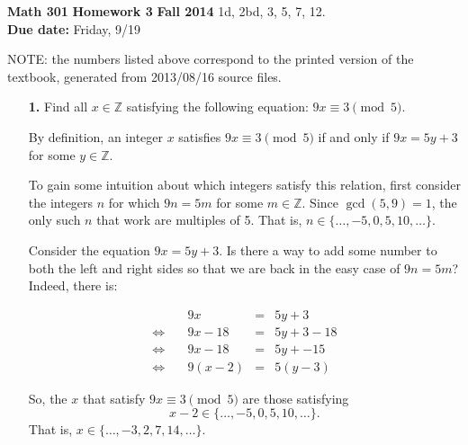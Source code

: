\documentclass[12pt,reqno]{amsart}
\newcommand{\Z}{\ensuremath{\mathbb{Z}}}
\newcommand{\<}{\ensuremath{\langle}}
\renewcommand{\>}{\ensuremath{\rangle}}
\begin{document}
\thispagestyle{empty}

\noindent \textbf{Math 301} \hskip5cm {\bf Homework 3} \hfill {\bf Fall 2014}
\vskip1cm
 1d, 2bd, 3, 5, 7, 12.  
\\
{\bf Due date:} Friday, 9/19

\medskip

\noindent NOTE: the numbers listed above correspond to the printed version of
the textbook, generated from 2013/08/16 source files.

\medskip

\begin{enumerate}

\item[{\bf 1.}]
Find all $x \in {\mathbb Z}$ satisfying the following equation:
$9x \equiv 3 \pmod{ 5}$.

\medskip

By definition, an integer $x$ satisfies $9x \equiv 3 \pmod{ 5}$ if and only if $9x = 5y + 3$
for some $y\in \Z$.

To gain some intuition about which integers satisfy this relation, first
consider the integers $n$ for which $9n = 5m$ for some $m\in \Z$.  Since
$\gcd(5,9) = 1$, the only such $n$ that work are multiples of 5.  That is, 
$n\in \{\dots, -5, 0, 5, 10, \dots\}$.

Consider the equation
$9x = 5y + 3$.  Is there a way to add some number to both the left and right
sides so that we are back in the easy case of $9n = 5m$?  Indeed, there is:

\[
\begin{array}{crcl}
& 9x &{=}& 5y + 3 \\
\Leftrightarrow \quad &         9x - 18 &{=}& 5y + 3 -18\\
\Leftrightarrow \quad & 9x - 18 &{=}& 5y + -15\\
\Leftrightarrow \quad & 9(x - 2) &{=}& 5(y -3)
\end{array}
\]

So, the $x$ that satisfy 
$9x \equiv 3 \pmod{ 5}$ are those satisfying 
\[
x-2 \in 
\{\dots, -5, 0, 5, 10, \dots\}.
\]
That is, $x \in \{\dots, -3, 2, 7, 14, \dots\}$.


\end{enumerate}
\end{document}
